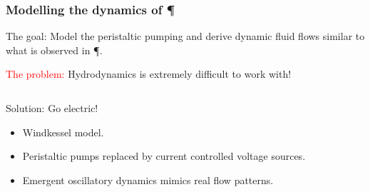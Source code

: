 \documentclass[	hyperref={pdfpagelabels=false}, xcolor=dvipsnames,
		11pt]{beamer}
\begin{document}
\begin{frame}
    \frametitle{Modelling the dynamics of \P} 

    \begin{block}{The goal:} 
    	Model the peristaltic pumping and derive dynamic fluid flows similar to what is observed in \P.
    \end{block}

	\textcolor{red}{The problem:} Hydrodynamics is extremely difficult to work with!

	\begin{columns}
	\begin{column}{4.5cm}

	\begin{overprint}

		\begin{block}{Solution: Go electric!}
		  \begin{itemize}
		   \item Windkessel model.
		   \item Peristaltic pumps replaced by current controlled voltage sources.
		   \item Emergent oscillatory dynamics mimics real flow patterns.
		  \end{itemize}
		\end{block}
	\end{overprint}

	\end{column}

	\begin{column}{5cm}
	\begin{overprint}

\end{overprint}
\end{column}
\end{columns}
\end{frame}
\end{document}
